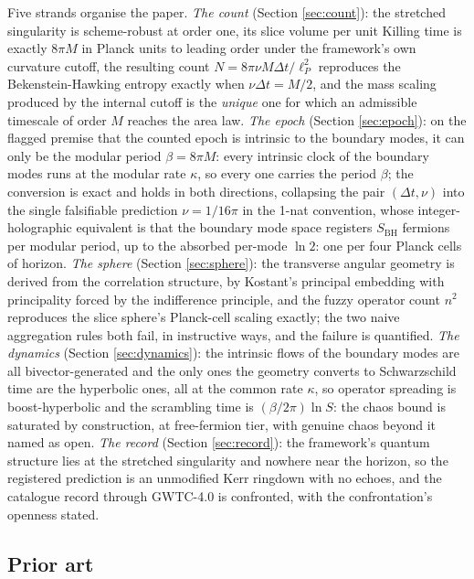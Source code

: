 \documentclass[11pt]{article}
\theoremstyle{definition}
\newcommand{\lP}{\ell_{P}}
\newcommand{\SBH}{S_{\mathrm{BH}}}
\begin{document}
Five strands organise the paper. \emph{The count} (Section \ref{sec:count}): the stretched singularity is scheme-robust at order one, its slice volume per unit Killing time is exactly $8\pi M$ in Planck units to leading order under the framework's own curvature cutoff, the resulting count $N = 8\pi\nu M\Delta t/\lP^2$ reproduces the Bekenstein-Hawking entropy exactly when $\nu\Delta t = M/2$, and the mass scaling produced by the internal cutoff is the \emph{unique} one for which an admissible timescale of order $M$ reaches the area law. \emph{The epoch} (Section \ref{sec:epoch}): on the flagged premise that the counted epoch is intrinsic to the boundary modes, it can only be the modular period $\beta = 8\pi M$: every intrinsic clock of the boundary modes runs at the modular rate $\kappa$, so every one carries the period $\beta$; the conversion is exact and holds in both directions, collapsing the pair $(\Delta t, \nu)$ into the single falsifiable prediction $\nu = 1/16\pi$ in the 1-nat convention, whose integer-holographic equivalent is that the boundary mode space registers $\SBH$ fermions per modular period, up to the absorbed per-mode $\ln 2$: one per four Planck cells of horizon. \emph{The sphere} (Section \ref{sec:sphere}): the transverse angular geometry is derived from the correlation structure, by Kostant's principal embedding with principality forced by the indifference principle, and the fuzzy operator count $n^2$ reproduces the slice sphere's Planck-cell scaling exactly; the two naive aggregation rules both fail, in instructive ways, and the failure is quantified. \emph{The dynamics} (Section \ref{sec:dynamics}): the intrinsic flows of the boundary modes are all bivector-generated and the only ones the geometry converts to Schwarzschild time are the hyperbolic ones, all at the common rate $\kappa$, so operator spreading is boost-hyperbolic and the scrambling time is $(\beta/2\pi)\ln S$: the chaos bound is saturated by construction, at free-fermion tier, with genuine chaos beyond it named as open. \emph{The record} (Section \ref{sec:record}): the framework's quantum structure lies at the stretched singularity and nowhere near the horizon, so the registered prediction is an unmodified Kerr ringdown with no echoes, and the catalogue record through GWTC-4.0 is confronted, with the confrontation's openness stated.

\subsection*{Prior art}
\end{document}
